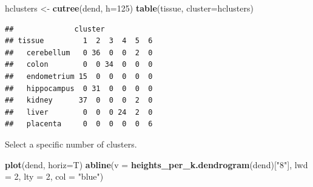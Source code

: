 \documentclass[]{book}
\newenvironment{Shaded}{\begin{snugshade}}{\end{snugshade}}
\newcommand{\KeywordTok}[1]{\textcolor[rgb]{0.13,0.29,0.53}{\textbf{{#1}}}}
\newcommand{\DataTypeTok}[1]{\textcolor[rgb]{0.13,0.29,0.53}{{#1}}}
\newcommand{\DecValTok}[1]{\textcolor[rgb]{0.00,0.00,0.81}{{#1}}}
\newcommand{\StringTok}[1]{\textcolor[rgb]{0.31,0.60,0.02}{{#1}}}
\newcommand{\NormalTok}[1]{{#1}}
\theoremstyle{definition}
\theoremstyle{definition}
\theoremstyle{definition}
\theoremstyle{remark}
\begin{document}
\begin{Shaded}
\begin{Highlighting}[]
\NormalTok{hclusters <-}\StringTok{ }\KeywordTok{cutree}\NormalTok{(dend, }\DataTypeTok{h=}\DecValTok{125}\NormalTok{)}
\KeywordTok{table}\NormalTok{(tissue, }\DataTypeTok{cluster=}\NormalTok{hclusters)}
\end{Highlighting}
\end{Shaded}

\begin{verbatim}
##              cluster
## tissue         1  2  3  4  5  6
##   cerebellum   0 36  0  0  2  0
##   colon        0  0 34  0  0  0
##   endometrium 15  0  0  0  0  0
##   hippocampus  0 31  0  0  0  0
##   kidney      37  0  0  0  2  0
##   liver        0  0  0 24  2  0
##   placenta     0  0  0  0  0  6
\end{verbatim}

Select a specific number of clusters.

\begin{Shaded}
\begin{Highlighting}[]
\KeywordTok{plot}\NormalTok{(dend, }\DataTypeTok{horiz=}\NormalTok{T)}
\KeywordTok{abline}\NormalTok{(}\DataTypeTok{v =} \KeywordTok{heights_per_k.dendrogram}\NormalTok{(dend)[}\StringTok{"8"}\NormalTok{], }\DataTypeTok{lwd =} \DecValTok{2}\NormalTok{, }\DataTypeTok{lty =} \DecValTok{2}\NormalTok{, }\DataTypeTok{col =} \StringTok{"blue"}\NormalTok{)}
\end{Highlighting}
\end{Shaded}
\end{document}
